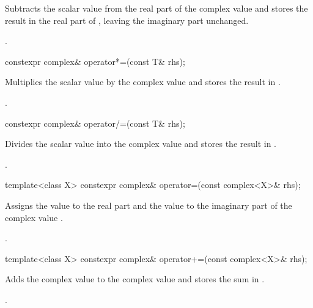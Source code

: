 \begin{itemdescr}
\pnum
\effects
Subtracts the scalar value  from the real part of the complex value
and stores the result in the real part of
,
leaving the imaginary part unchanged.

\pnum
\returns
{}.
\end{itemdescr}

%
\begin{itemdecl}
constexpr complex& operator*=(const T& rhs);
\end{itemdecl}

\begin{itemdescr}
\pnum
\effects
Multiplies the scalar value  by the complex value
and stores the result in
.

\pnum
\returns
{}.
\end{itemdescr}

%
\begin{itemdecl}
constexpr complex& operator/=(const T& rhs);
\end{itemdecl}

\begin{itemdescr}
\pnum
\effects
Divides the scalar value  into the complex value
and stores the result in
.

\pnum
\returns
{}.
\end{itemdescr}

%
\begin{itemdecl}
template<class X> constexpr complex& operator=(const complex<X>& rhs);
\end{itemdecl}

\begin{itemdescr}
\pnum
\effects
Assigns the value  to the real part and
the value  to the imaginary part
of the complex value .

\pnum
\returns
{}.
\end{itemdescr}

%
\begin{itemdecl}
template<class X> constexpr complex& operator+=(const complex<X>& rhs);
\end{itemdecl}

\begin{itemdescr}
\pnum
\effects
Adds the complex value  to the complex value
and stores the sum in
.

\pnum
\returns
{}.
\end{itemdescr}

